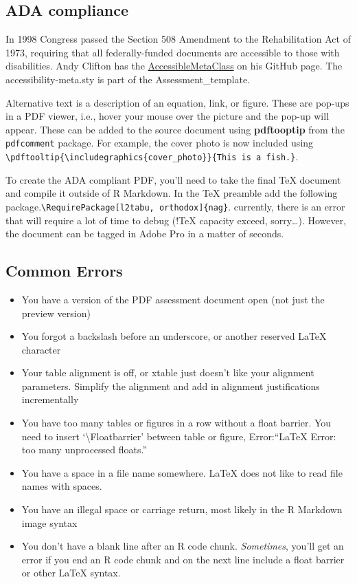 \documentclass[12pt,]{article}
\begin{document}
\subsection{ADA compliance}\label{ada-compliance}

In 1998 Congress passed the Section 508 Amendment to the Rehabilitation
Act of 1973, requiring that all federally-funded documents are
accessible to those with disabilities. Andy Clifton has the
\href{https://github.com/AndyClifton/AccessibleMetaClass}{AccessibleMetaClass}
on his GitHub page. The accessibility-meta.sty is part of the
Assessment\_template.

Alternative text is a description of an equation, link, or figure. These
are pop-ups in a PDF viewer, i.e., hover your mouse over the picture and
the pop-up will appear. These can be added to the source document using
\textbf{pdftooptip} from the \texttt{pdfcomment} package. For example,
the cover photo is now included using
\texttt{\textbackslash{}pdftooltip\{\textbackslash{}includegraphics\{cover\_photo\}\}\{This\ is\ a\ fish.\}}.

To create the ADA compliant PDF, you'll need to take the final TeX
document and compile it outside of R Markdown. In the TeX preamble add
the following
package.\texttt{\textbackslash{}RequirePackage{[}l2tabu,\ orthodox{]}\{nag\}}.
currently, there is an error that will require a lot of time to debug
(!TeX capacity exceed, sorry\ldots{}). However, the document can be
tagged in Adobe Pro in a matter of seconds.

\subsection{Common Errors}\label{common-errors}

\begin{itemize}
\item
  You have a version of the PDF assessment document open (not just the
  preview version)
\item
  You forgot a backslash before an underscore, or another reserved LaTeX
  character
\item
  Your table alignment is off, or xtable just doesn't like your
  alignment parameters. Simplify the alignment and add in alignment
  justifications incrementally
\item
  You have too many tables or figures in a row without a float barrier.
  You need to insert `\textbackslash{}Floatbarrier' between table or
  figure, Error:``LaTeX Error: too many unprocessed floats.''
\item
  You have a space in a file name somewhere. LaTeX does not like to read
  file names with spaces.
\item
  You have an illegal space or carriage return, most likely in the R
  Markdown image syntax
\item
  You don't have a blank line after an R code chunk. \emph{Sometimes},
  you'll get an error if you end an R code chunk and on the next line
  include a float barrier or other LaTeX syntax.
\end{itemize}
\end{document}
